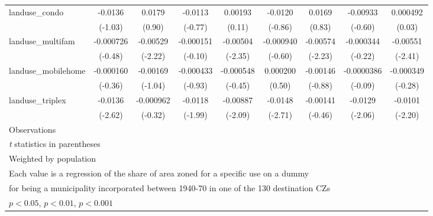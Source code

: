 \begin{table}[htbp]
\begin{tabular}{l*{8}{c}}
\addlinespace
landuse\_condo       &     -0.0136         &      0.0179         &     -0.0113         &     0.00193         &     -0.0120         &      0.0169         &    -0.00933         &    0.000492         \\
                    &     (-1.03)         &      (0.90)         &     (-0.77)         &      (0.11)         &     (-0.86)         &      (0.83)         &     (-0.60)         &      (0.03)         \\
\addlinespace
landuse\_multifam    &   -0.000726         &    -0.00529\sym{*}  &   -0.000151         &    -0.00504\sym{*}  &   -0.000940         &    -0.00574\sym{*}  &   -0.000344         &    -0.00551\sym{*}  \\
                    &     (-0.48)         &     (-2.22)         &     (-0.10)         &     (-2.35)         &     (-0.60)         &     (-2.23)         &     (-0.22)         &     (-2.41)         \\
\addlinespace
landuse\_mobilehome  &   -0.000160         &    -0.00169         &   -0.000433         &   -0.000548         &    0.000200         &    -0.00146         &  -0.0000386         &   -0.000349         \\
                    &     (-0.36)         &     (-1.04)         &     (-0.93)         &     (-0.45)         &      (0.50)         &     (-0.88)         &     (-0.09)         &     (-0.28)         \\
\addlinespace
landuse\_triplex     &     -0.0136\sym{**} &   -0.000962         &     -0.0118\sym{*}  &    -0.00887\sym{*}  &     -0.0148\sym{**} &    -0.00141         &     -0.0129\sym{*}  &     -0.0101\sym{*}  \\
                    &     (-2.62)         &     (-0.32)         &     (-1.99)         &     (-2.09)         &     (-2.71)         &     (-0.46)         &     (-2.06)         &     (-2.20)         \\
\midrule
Observations        &                     &                     &                     &                     &                     &                     &                     &                     \\
\bottomrule
\multicolumn{9}{l}{\footnotesize \textit{t} statistics in parentheses}\\
\multicolumn{9}{l}{\footnotesize Weighted by population}\\
\multicolumn{9}{l}{\footnotesize Each value is a regression of the share of area zoned for a specific use on a dummy}\\
\multicolumn{9}{l}{\footnotesize for being a municipality incorporated between 1940-70 in one of the 130 destination CZs}\\
\multicolumn{9}{l}{\footnotesize \sym{*} \(p<0.05\), \sym{**} \(p<0.01\), \sym{***} \(p<0.001\)}\\
\end{tabular}
\end{table}
